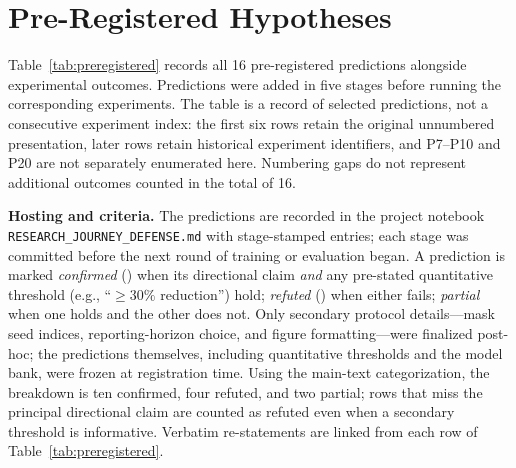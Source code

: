 \appendix

\section{Pre-Registered Hypotheses}
\label{sec:appendix_preregistered}

Table~\ref{tab:preregistered} records all 16 pre-registered predictions alongside
experimental outcomes. Predictions were added in five stages before running the
corresponding experiments. The table is a record of selected predictions,
not a consecutive experiment index: the first six rows retain the original
unnumbered presentation, later rows retain historical experiment identifiers,
and P7--P10 and P20 are not separately enumerated here. Numbering gaps do not
represent additional outcomes counted in the total of 16.

\textbf{Hosting and criteria.}
The predictions are recorded in the project notebook
\texttt{RESEARCH\_JOURNEY\_DEFENSE.md} with stage-stamped entries; each stage
was committed before the next round of training or evaluation began. A
prediction is marked \emph{confirmed} ({\checkmark}) when its directional claim
\emph{and} any pre-stated quantitative threshold (e.g., ``$\geq 30\%$
reduction'') hold; \emph{refuted} ({\texttimes}) when either fails;
\emph{partial} when one holds and the other does not. Only secondary protocol
details---mask seed indices, reporting-horizon choice, and figure
formatting---were finalized post-hoc; the predictions themselves, including
quantitative thresholds and the model bank, were frozen at registration time.
Using the main-text categorization, the breakdown is ten confirmed, four
refuted, and two partial; rows that miss the principal directional claim are
counted as refuted even when a secondary threshold is informative. Verbatim
re-statements are linked from each row of Table~\ref{tab:preregistered}.

